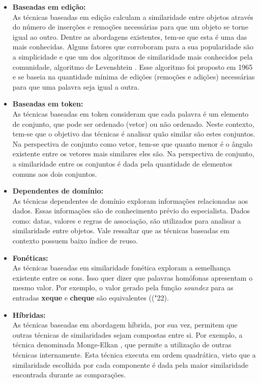 \begin{itemize}
	\item \textbf{Baseadas em edição:}\\
	As técnicas baseadas em edição calculam a similaridade entre objetos através do número de inserções e remoções necessárias para que um objeto se torne igual ao outro. 
	Dentre as abordagens existentes, tem-se que esta é uma das mais conhecidas. Alguns fatores que corroboram para a sua popularidade são a simplicidade e que um dos algoritmos de similaridade mais conhecidos pela comunidade, algoritmo de Levenshtein \cite{levenshtein1966binary}. Esse algoritmo foi proposto em 1965 e se baseia na quantidade mínima de edições (remoções e adições) necessárias para que uma palavra seja igual a outra.
	
	\item \textbf{Baseadas em token:}\\
	As técnicas baseadas em token consideram que cada palavra é um elemento de conjunto, que pode ser ordenado (vetor) ou não ordenado. Neste contexto, tem-se que o objetivo das técnicas é analisar quão similar são estes conjuntos. Na perspectiva de conjunto como vetor, tem-se que quanto menor é o ângulo existente entre os vetores mais similares eles são. Na perspectiva de conjunto, a similaridade entre os conjuntos é dada pela quantidade de elementos comuns aos dois conjuntos.
	
	\item \textbf{Dependentes de domínio:}\\
	As técnicas dependentes de domínio exploram informações relacionadas aos dados. Essas informações são de conhecimento prévio do especialista. Dados como: datas, valores e regras de associação, são utilizados para analisar a similaridade entre objetos. Vale ressaltar que as técnicas baseadas em contexto possuem baixo índice de reuso.
	
	\item \textbf{Fonéticas:}\\
	As técnicas baseadas em similaridade fonética exploram a semelhança existente entre os sons. Isso quer dizer que palavras homófonas apresentam o mesmo valor. Por exemplo, o valor gerado pela função \textit{soundex} para as entradas \textbf{xeque} e \textbf{cheque} são equivalentes (("22).
	
	\item \textbf{Híbridas:}\\
	As técnicas baseadas em abordagem híbrida, por sua vez, permitem que outras técnicas de similaridades sejam compostas entre si. Por exemplo, a técnica denominada Monge-Elkan \cite{monge1996field}, que permite a utilização de outras técnicas internamente. Esta técnica executa em ordem quadrática, visto que a similaridade escolhida por cada componente é dada pela maior similaridade encontrada durante as comparações.
\end{itemize}

